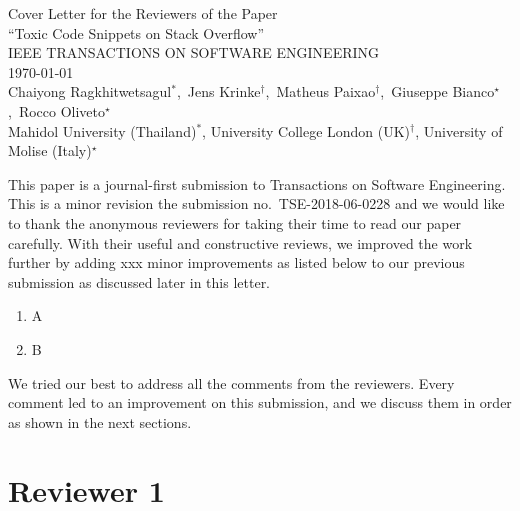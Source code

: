 \documentclass[a4paper,twoside,10pt]{reviewresponse}
\newcommand{\myAuthors}{Chaiyong Ragkhitwetsagul$^\ast$,~Jens Krinke$^\dagger$,~Matheus Paixao$^\dagger$,~Giuseppe Bianco$^\star$,~Rocco Oliveto$^\star$}
\newcommand{\myTitle}{Cover Letter for the Reviewers of the Paper \\ ``Toxic Code Snippets on Stack Overflow''}
\newcommand{\myJournal}{IEEE TRANSACTIONS ON SOFTWARE ENGINEERING}
\newcommand{\myDept}{Mahidol University (Thailand)$^\ast$, University College London (UK)$^\dagger$, University of Molise (Italy)$^\star$}
\begin{document}
\thispagestyle{plain}

\begin{center}
 {\LARGE\myTitle} \vspace{0.3cm} \\
 {\large\myJournal} \vspace{0.3cm} \\
 \today \vspace{0.3cm} \\
 \myAuthors \\
 \vspace{0.3cm} 
 \myDept \vspace{1cm}
\end{center}


This paper is a journal-first submission to Transactions on Software
Engineering. This is a minor revision the submission
no.~TSE-2018-06-0228 and we would like to thank the anonymous reviewers for
taking their time to read our paper carefully. With their useful and
constructive reviews, we improved the work further by adding xxx minor
improvements as listed below to our previous submission as discussed later in this letter.

\begin{enumerate}
	\item A
	\item B
\end{enumerate}

We tried our best to address all the comments from the reviewers. Every
comment led to an improvement on this submission, and we discuss them in order as
shown in the next sections.


\clearpage

\section{Reviewer 1}
\end{document}
